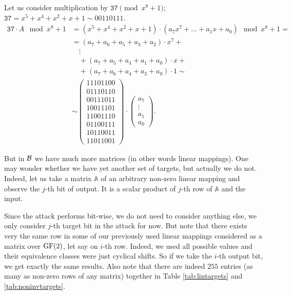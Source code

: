 \begin{example}
	Let us consider multiplication by $\texttt{37}\pmod{x^8+1}$; $\texttt{37} = x^5+x^4+x^2+x+1 \sim 00110111$.
	\begin{align*}
		\texttt{37} \cdot A \mod{x^8+1} &= (x^5+x^4+x^2+x+1) \cdot (a_7x^7+\ldots+a_1x+a_0) \mod{x^8+1} = \\
		&= (a_7+a_6+a_5+a_3+a_2)\cdot x^7 + ~\\
		&\quad\vdots \\
		&\quad + (a_7+a_5+a_4+a_1+a_0)\cdot x + ~\\
		&\quad + (a_7+a_6+a_4+a_3+a_0)\cdot 1 \sim \\
		&\sim
		\begin{pmatrix}
			11101100 \\
			01110110 \\
			00111011 \\
			10011101 \\
			11001110 \\
			01100111 \\
			10110011 \\
			11011001
		\end{pmatrix}
		\cdot
		\begin{pmatrix}
			a_7 \\ \vdots \\ a_1 \\ a_0
		\end{pmatrix}.
	\end{align*}
\end{example}

But in $\cal B$ we have much more matrices (in other words linear mappings). One may wonder whether we have yet another set of targets, but actually we do not. Indeed, let us take a matrix $\mathbb{A}$ of an arbitrary non-zero linear mapping and observe the $j$-th bit of output. It is a scalar product of $j$-th row of $\mathbb{A}$ and the input.

Since the attack performs bit-wise, we do not need to consider anything else, we only consider $j$-th target bit in the attack for now. But note that there exists very the same row in some of our previously used linear mappings considered as a matrix over $\mathrm{GF}(2)$, let say on $i$-th row. Indeed, we used all possible values and their equivalence classes were just cyclical shifts. So if we take the $i$-th output bit, we get exactly the same results. Also note that there are indeed $255$ entries (as many as non-zero rows of any matrix) together in Table \ref{tab:lintargets} and \ref{tab:noninvtargets}.

